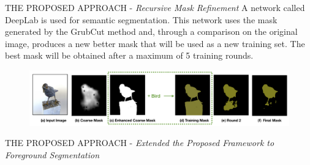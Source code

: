 \begin{frame}{THE PROPOSED APPROACH - \emph{Recursive Mask Refinement}}
    A network called DeepLab  is used for semantic segmentation. This 
    network uses the mask generated by the GrubCut method and, through a 
    comparison on the original image, produces a new better mask that will 
    be used as a new training set. The best mask will be obtained after a 
    maximum of 5 training rounds.
    \begin{figure}[h!]
        \centering
        \includegraphics[width = 1 \linewidth]{images/paper6/DeepLab.png}
        \centering
    \end{figure}
\end{frame}

\begin{frame}{THE PROPOSED APPROACH - \emph{Extended the Proposed Framework to Foreground Segmentation}}
    
\end{frame}




